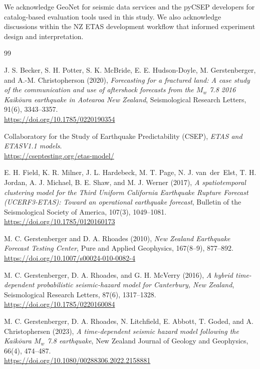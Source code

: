 \documentclass[12pt,letterpaper]{article}
\begin{document}
We acknowledge GeoNet for seismic data services and the pyCSEP developers for
catalog-based evaluation tools used in this study. We also acknowledge
discussions within the NZ ETAS development workflow that informed experiment
design and interpretation.

\newpage
\begin{thebibliography}{99}

J. S. Becker, S. H. Potter, S. K. McBride, E. E. Hudson-Doyle,
M. Gerstenberger, and A.-M. Christopherson (2020),
\emph{Forecasting for a fractured land: A case study of the communication and
use of aftershock forecasts from the $M_w$ 7.8 2016 Kaik\={o}ura earthquake in
Aotearoa New Zealand},
Seismological Research Letters, 91(6), 3343--3357.\\
\url{https://doi.org/10.1785/0220190354}

Collaboratory for the Study of Earthquake Predictability (CSEP),
\emph{ETAS and ETASV1.1 models}.\\
\url{https://cseptesting.org/etas-model/}

E. H. Field, K. R. Milner, J. L. Hardebeck, M. T. Page,
N. J. van~der~Elst, T. H. Jordan, A. J. Michael, B. E. Shaw, and
M. J. Werner (2017),
\emph{A spatiotemporal clustering model for the Third Uniform California
Earthquake Rupture Forecast (UCERF3-ETAS): Toward an operational earthquake
forecast},
Bulletin of the Seismological Society of America, 107(3), 1049--1081.\\
\url{https://doi.org/10.1785/0120160173}

M. C. Gerstenberger and D. A. Rhoades (2010),
\emph{New Zealand Earthquake Forecast Testing Center},
Pure and Applied Geophysics, 167(8--9), 877--892.\\
\url{https://doi.org/10.1007/s00024-010-0082-4}

M. C. Gerstenberger, D. A. Rhoades, and G. H. McVerry (2016),
\emph{A hybrid time-dependent probabilistic seismic-hazard model for
Canterbury, New Zealand},
Seismological Research Letters, 87(6), 1317--1328.\\
\url{https://doi.org/10.1785/0220160084}

M. C. Gerstenberger, D. A. Rhoades, N. Litchfield, E. Abbott, T. Goded, and
A. Christophersen (2023),
\emph{A time-dependent seismic hazard model following the Kaik\={o}ura
$M_w$ 7.8 earthquake},
New Zealand Journal of Geology and Geophysics, 66(4), 474--487.\\
\url{https://doi.org/10.1080/00288306.2022.2158881}


\end{thebibliography}
\end{document}
